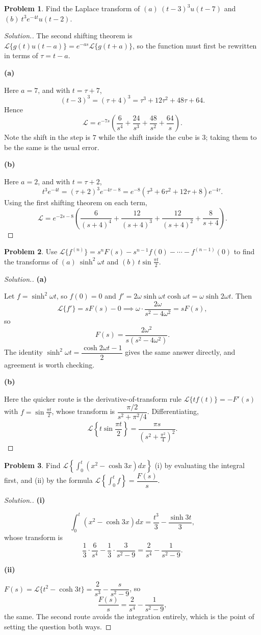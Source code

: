\documentclass[11pt,a4paper]{article}
\theoremstyle{definition}
\newtheorem{problemx}{Problem}[subsection]
\newenvironment{problem}{\begin{problemx}}{\end{problemx}}
\newenvironment{solution}
  {\renewcommand{\qedsymbol}{}\begin{proof}[\textit{Solution}.]}
  {\end{proof}}
\newcommand{\subhead}[1]{%
  \par\medskip\noindent\textbf{#1}\par\nobreak\smallskip}
\begin{document}
\begin{problem}
Find the Laplace transform of
$(a)\ (t-3)^3u(t-7)$ and $(b)\ t^3e^{-4t}u(t-2)$.
\end{problem}
\begin{solution}
The second shifting theorem is
$\mathcal{L}\{g(t)u(t-a)\} = e^{-as}\mathcal{L}\{g(t+a)\}$, so the function must
first be rewritten in terms of $\tau = t-a$.

\subhead{(a)}
Here $a=7$, and with $t = \tau+7$,
\[(t-3)^3 = (\tau+4)^3 = \tau^3+12\tau^2+48\tau+64 .\]
Hence
\[\mathcal{L} = e^{-7s}\left(\frac{6}{s^4} + \frac{24}{s^3}
+ \frac{48}{s^2} + \frac{64}{s}\right).\]
Note the shift in the step is $7$ while the shift inside the cube is $3$; taking
them to be the same is the usual error.

\subhead{(b)}
Here $a=2$, and with $t = \tau+2$,
\[t^3e^{-4t} = (\tau+2)^3e^{-4\tau-8}
= e^{-8}(\tau^3+6\tau^2+12\tau+8)e^{-4\tau}.\]
Using the first shifting theorem on each term,
\[\mathcal{L} = e^{-2s-8}\left(\frac{6}{(s+4)^4} + \frac{12}{(s+4)^3}
+ \frac{12}{(s+4)^2} + \frac{8}{s+4}\right).\]
\end{solution}

\begin{problem}
Use $\mathcal{L}\{f^{(n)}\} = s^nF(s)-s^{n-1}f(0)-\cdots-f^{(n-1)}(0)$ to find
the transforms of $(a)\ \sinh^2\omega t$ and $(b)\ t\sin\frac{\pi t}{2}$.
\end{problem}
\begin{solution}
\subhead{(a)}
Let $f = \sinh^2\omega t$, so $f(0)=0$ and
$f' = 2\omega\sinh\omega t\cosh\omega t = \omega\sinh 2\omega t$. Then
\[\mathcal{L}\{f'\} = sF(s) - 0
\implies \omega\cdot\frac{2\omega}{s^2-4\omega^2} = sF(s),\]
so
\[F(s) = \frac{2\omega^2}{s(s^2-4\omega^2)}.\]
The identity $\sinh^2\omega t = \dfrac{\cosh 2\omega t-1}{2}$ gives the same
answer directly, and agreement is worth checking.

\subhead{(b)}
Here the quicker route is the derivative-of-transform rule
$\mathcal{L}\{tf(t)\} = -F'(s)$ with $f = \sin\frac{\pi t}{2}$, whose transform
is $\dfrac{\pi/2}{s^2+\pi^2/4}$. Differentiating,
\[\mathcal{L}\left\{t\sin\frac{\pi t}{2}\right\}
= \frac{\pi s}{\left(s^2+\frac{\pi^2}{4}\right)^2}.\]
\end{solution}

\begin{problem}
Find $\displaystyle{\mathcal{L}\left\{\int_0^t(x^2-\cosh 3x)dx\right\}}$
(i) by evaluating the integral first, and (ii) by the formula
$\mathcal{L}\left\{\int_0^tf\right\} = \dfrac{F(s)}{s}$.
\end{problem}
\begin{solution}
\subhead{(i)}
\[\int_0^t(x^2-\cosh 3x)dx = \frac{t^3}{3} - \frac{\sinh 3t}{3},\]
whose transform is
\[\frac13\cdot\frac{6}{s^4} - \frac13\cdot\frac{3}{s^2-9}
= \frac{2}{s^4} - \frac{1}{s^2-9}.\]

\subhead{(ii)}
$F(s) = \mathcal{L}\{t^2-\cosh 3t\} = \dfrac{2}{s^3} - \dfrac{s}{s^2-9}$, so
\[\frac{F(s)}{s} = \frac{2}{s^4} - \frac{1}{s^2-9},\]
the same. The second route avoids the integration entirely, which is the point
of setting the question both ways.
\end{solution}
\end{document}
